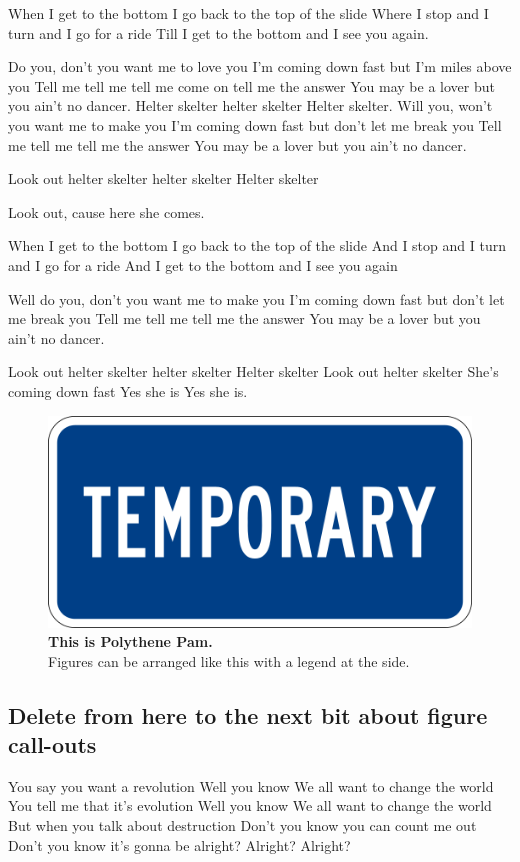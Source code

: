 When I get to the bottom I go back to the top of the slide
Where I stop and I turn and I go for a ride
Till I get to the bottom and I see you again.

Do you, don't you want me to love you
I'm coming down fast but I’m miles above you
Tell me tell me tell me come on tell me the answer
You may be a lover but you ain't no dancer.
Helter skelter helter skelter
Helter skelter.
Will you, won't you want me to make you
I'm coming down fast but don't let me break you
Tell me tell me tell me the answer
You may be a lover but you ain't no dancer.

Look out helter skelter helter skelter
Helter skelter 

Look out, cause here she comes.

When I get to the bottom I go back to the top of the slide
And I stop and I turn and I go for a ride
And I get to the bottom and I see you again

Well do you, don't you want me to make you
I'm coming down fast but don't let me break you
Tell me tell me tell me the answer
You may be a lover but you ain't no dancer.

Look out helter skelter helter skelter
Helter skelter
Look out helter skelter
She's coming down fast 
Yes she is 
Yes she is.

\begin{figure}
\centering
\includegraphics[width=1.5\linewidth]{Figures/temp.png}
\caption{\textbf{This is Polythene Pam.}\\
Figures can be arranged like this with a legend at the side.}
\label{fig:pam}
\end{figure}

\subsection*{Delete from here to the next bit about figure call-outs}
You say you want a revolution
Well you know
We all want to change the world
You tell me that it’s evolution
Well you know
We all want to change the world
But when you talk about destruction
Don’t you know you can count me out
Don’t you know it’s gonna be alright?
Alright?
Alright?


